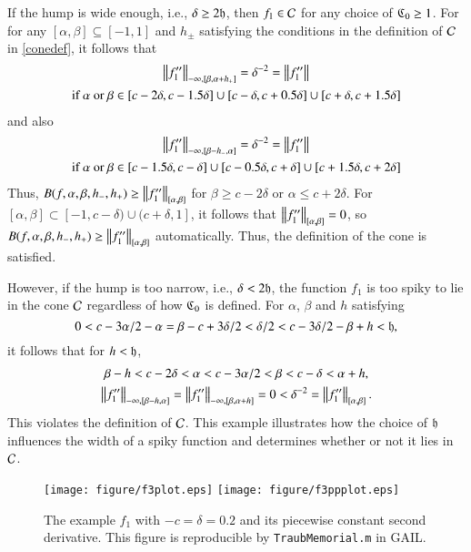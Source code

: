\documentclass[review]{elsarticle}
\theoremstyle{definition}
\begin{document}
If the hump is wide enough, i.e., $\delta \ge 2 \fh$, then $f_1 \in \cc$ for any
choice of $\fC_0 \ge 1$. For for any $[\alpha,\beta]\subseteq [-1,1]$ and $h_{\pm}$ satisfying the conditions in the definition of $\cc$ in \eqref{conedef}, it follows that
\begin{multline*}
\norm[-\infty,{[\beta,\alpha+h_+]}]{f''_1} = \delta^{-2} = \norm{f''_1}\\
\text{if } \alpha\text{ or } \beta \in [c - 2\delta,  c - 1.5\delta]  \cup [c - \delta,  c + 0.5\delta] \cup [c + \delta, c+1.5\delta] 
\end{multline*}
and also
\begin{multline*}
\norm[-\infty,{[\beta - h_-,\alpha]}]{f''_1} = \delta^{-2} = \norm{f''_1}\\
\text{if } \alpha\text{ or } \beta \in [c - 1.5\delta,  c - \delta]  \cup [c - 0.5 \delta,  c + \delta] \cup [c + 1.5\delta, c+2\delta]
\end{multline*}
Thus, $B(f,\alpha,\beta,h_-,h_+)\ge\norm[{[\alpha,\beta]}]{f''_1}$ for $\beta \ge  c - 2\delta$ or $\alpha \le c + 2\delta$.  For $[\alpha,\beta] \subset [-1,c - \delta) \cup (c+\delta, 1]$, it follows that $\norm[{[\alpha,\beta]}]{f''_1} = 0$, so $B(f,\alpha,\beta,h_-,h_+)\ge\norm[{[\alpha,\beta]}]{f''_1}$ automatically.  Thus, the definition of the cone is satisfied.

However, if the hump is too narrow, i.e., $\delta < 2 \fh$, the function $f_1$
is too spiky to lie in the cone $\cc$ regardless of how
$\fC_0$ is defined.  For $\alpha$, $\beta$ and $h$ satisfying 
\[
0 < c - 3\alpha/2 -\alpha =  \beta - c+ 3\delta/2 < \delta/2 < c-3\delta/2 - \beta + h < \fh,
\]
it follows that for $h < \fh$,
\begin{gather*}
\beta -  h < c - 2 \delta < \alpha < c - 3\alpha/2 < \beta < c - \delta < \alpha + h, \\
\norm[-\infty,{[\beta - h,\alpha]}]{f''_1} =\norm[-\infty,{[\beta,\alpha+h]}]{f''_1}=0 < \delta^{-2} =\norm[{[\alpha,\beta]}]{f''_1}.
\end{gather*}
This violates the definition of $\cc$. This example illustrates how the choice
of $\fh$ influences the width of a spiky function and determines whether or not it lies in
$\cc$.

\begin{figure}[t]
\centering
\texttt{[image: figure/f3plot.eps]} \quad
\texttt{[image: figure/f3ppplot.eps]}
\caption{The example $f_1$ with $-c=\delta = 0.2$ and its piecewise constant
second derivative. This figure is reproducible by {\tt TraubMemorial.m} in
GAIL.}
\label{f3fig}
\end{figure}
\end{document}
